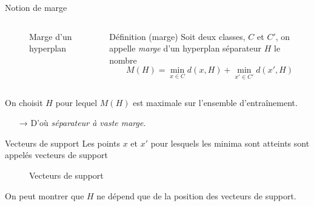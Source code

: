 \documentclass[hyperref={unicode}, xcolor={svgnames}, french]{beamer}
\begin{document}
\begin{frame}[fragile]{Notion de marge}
\begin{overprint}
\begin{columns}
\begin{figure}
                        \caption{Marge d'un hyperplan}
                    \end{figure}
                    \begin{block}{Définition (marge)}
                        Soit deux classes, $C$ et $C'$, on appelle \emph{marge} d'un hyperplan séparateur $H$ le nombre
                        \begin{equation}
                            M(H) = \min_{x∈C}d(x, H) + \min_{x'∈C'}d(x', H)
                        \end{equation}
                    \end{block}
            \end{columns}
            On choisit $H$ pour lequel $M(H)$ est maximale sur l'ensemble d'entraînement.
            \begin{itemize}
                \item[→] D'où \emph{séparateur à \alert{vaste marge}}.
            \end{itemize}
    \end{overprint}
\end{frame}

\begin{frame}{Vecteurs de support}
    Les points $x$ et $x'$ pour lesquels les minima sont atteints sont appelés \textcolor{highlight7}{vecteurs de support}
    \begin{figure}
        \tikzset{external/export=true}
        \caption{Vecteurs de support}
    \end{figure}
    On peut montrer que $H$ ne dépend que de la position des vecteurs de support.
\end{frame}
\end{document}
